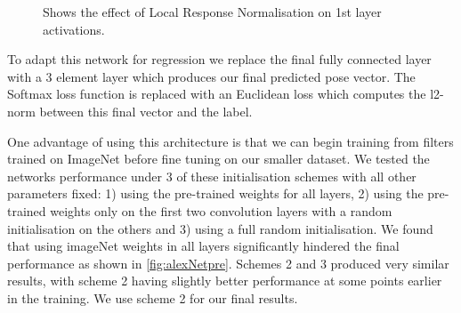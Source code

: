 \documentclass[11pt]{article} %
\begin{document}
\begin{figure}
\centering
{}%
\qquad
{}%
\caption{Shows the effect of Local Response Normalisation on 1st layer activations. }
\label{fig:LRN}
\end{figure}

To adapt this network for regression we replace the final fully connected layer with a 3 element layer which produces our final predicted pose vector. The Softmax loss function is replaced with an Euclidean loss which computes the l2-norm between this final vector and the label.

One advantage of using this architecture is that we can begin training from filters trained on ImageNet before fine tuning on our smaller dataset. We tested the networks performance under 3 of these initialisation schemes with all other parameters fixed: 1) using the pre-trained weights for all layers, 2) using the pre-trained weights only on the first two convolution layers with a random initialisation on the others and 3) using a full random initialisation. We found that using imageNet weights in all layers significantly hindered the final performance as shown in \ref{fig:alexNetpre}. Schemes 2 and 3 produced very similar results, with scheme 2 having slightly better performance at some points earlier in the training. We use scheme 2 for our final results.
\end{document}
